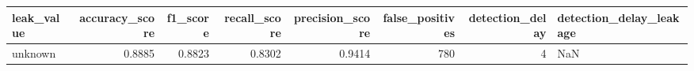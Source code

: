 \begin{tabular}{lrrrrrrl}
\toprule
leak\_value & accuracy\_score & f1\_score & recall\_score & precision\_score & false\_positives & detection\_delay & detection\_delay\_leakage \\
\midrule
unknown & 0.8885 & 0.8823 & 0.8302 & 0.9414 & 780 & 4 & NaN \\
\bottomrule
\end{tabular}
